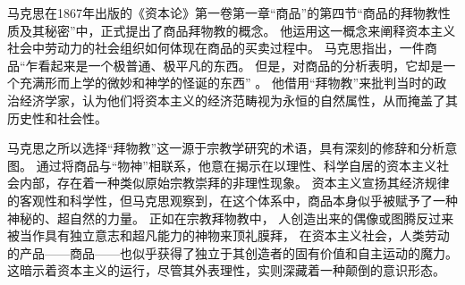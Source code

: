 马克思在1867年出版的《资本论》第一卷第一章“商品”的第四节“商品的拜物教性质及其秘密”中，正式提出了商品拜物教的概念。
他运用这一概念来阐释资本主义社会中劳动力的社会组织如何体现在商品的买卖过程中。
马克思指出，一件商品“乍看起来是一个极普通、极平凡的东西。
但是，对商品的分析表明，它却是一个充满形而上学的微妙和神学的怪诞的东西” \autocite{marx}。
他借用“拜物教”来批判当时的政治经济学家，认为他们将资本主义的经济范畴视为永恒的自然属性，从而掩盖了其历史性和社会性。

马克思之所以选择“拜物教”这一源于宗教学研究的术语，具有深刻的修辞和分析意图。
通过将商品与“物神”相联系，他意在揭示在以理性、科学自居的资本主义社会内部，存在着一种类似原始宗教崇拜的非理性现象。
资本主义宣扬其经济规律的客观性和科学性，但马克思观察到，在这个体系中，商品本身似乎被赋予了一种神秘的、超自然的力量。
正如在宗教拜物教中，
人创造出来的偶像或图腾反过来被当作具有独立意志和超凡能力的神物来顶礼膜拜，
在资本主义社会，人类劳动的产品——商品——也似乎获得了独立于其创造者的固有价值和自主运动的魔力。
这暗示着资本主义的运行，尽管其外表理性，实则深藏着一种颠倒的意识形态。